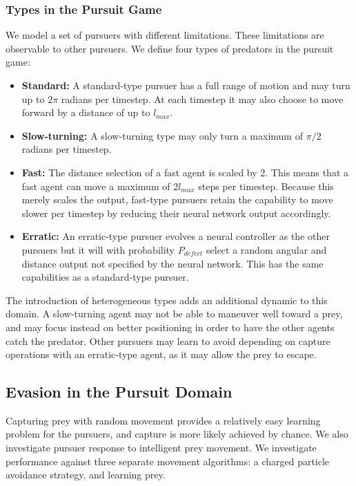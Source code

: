 \documentclass{aamas2014}
\begin{document}
\subsubsection{Types in the Pursuit Game}

We model a set of pursuers with different limitations. These limitations are observable to other pursuers. We define four types of predators in the pursuit game:

\begin{itemize}
\item \textbf{Standard:} A standard-type pursuer has a full range of motion and may turn up to $2\pi$ radians per timestep. At each timestep it may also choose to move forward by a distance of up to $l_{max}$.

\item \textbf{Slow-turning:} A slow-turning type may only turn a maximum of $\pi/2$ radians per timestep. 

\item \textbf{Fast:} The distance selection of a fast agent is scaled by 2. This means that a fast agent can move a maximum of $2 l_{max}$ steps per timestep. Because this merely scales the output, fast-type pursuers retain the capability to move slower per timestep by reducing their neural network output accordingly.

\item \textbf{Erratic:} An erratic-type pursuer evolves a neural controller as the other pursuers but it will with probability $P_{defect}$ select a random angular and distance output not specified by the neural network. This has the same capabilities as a standard-type pursuer.


\end{itemize}

The introduction of heterogeneous types adds an additional dynamic to this domain. A slow-turning agent may not be able to maneuver well toward a prey, and may focus instead on better positioning in order to have the other agents catch the predator. Other pursuers may learn to avoid depending on capture operations with an erratic-type agent, as it may allow the prey to escape.


\subsection{Evasion in the Pursuit Domain}

Capturing prey with random movement provides a relatively easy learning problem for the pursuers, and capture is more likely achieved by chance. We also investigate pursuer response to intelligent prey movement. We investigate performance against three separate movement algorithms: a charged particle avoidance strategy, and learning prey.
\end{document}
